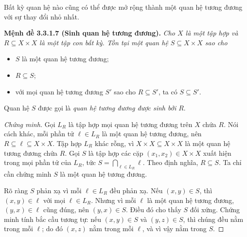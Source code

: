Bất kỳ quan hệ nào cũng có thể được mở rộng thành một quan hệ tương đương với sự thay đổi nhỏ nhất.

\noindent\textbf{Mệnh đề 3.3.1.7 (Sinh quan hệ tương đương).} \emph{Cho $X$ là một tập hợp và $R\subseteq X\times X$ là một tập con bất kỳ. Tồn tại một quan hệ $S\subseteq X\times X$ sao cho}
\begin{itemize}
\item $S$ là một quan hệ tương đương;
\item $R\subseteq S$;
\item với mọi quan hệ tương đương $S'$ sao cho $R\subseteq S'$, ta có $S\subseteq S'$.
\end{itemize}
Quan hệ $S$ được gọi là \emph{quan hệ tương đương được sinh bởi $R$}.

\begin{proof}[Chứng minh]
Gọi $L_R$ là tập hợp mọi quan hệ tương đương trên $X$ chứa $R$. Nói cách khác, mỗi phần tử $\ell\in L_R$ là một quan hệ tương đương, nên $R\subseteq\ell\subseteq X\times X$. Tập hợp $L_R$ khác rỗng, vì $X\times X\subseteq X\times X$ là một quan hệ tương đương chứa $R$. Gọi $S$ là tập hợp các cặp $(x_1,x_2)\in X\times X$ xuất hiện trong mọi phần tử của $L_R$, tức $S=\bigcap_{\ell\in L_R}\ell$. Theo định nghĩa, $R\subseteq S$. Ta chỉ cần chứng minh $S$ là một quan hệ tương đương.

Rõ ràng $S$ phản xạ vì mỗi $\ell\in L_R$ đều phản xạ. Nếu $(x,y)\in S$, thì $(x,y)\in\ell$ với mọi $\ell\in L_R$. Nhưng vì mỗi $\ell$ là một quan hệ tương đương, $(y,x)\in\ell$ cũng đúng, nên $(y,x)\in S$. Điều đó cho thấy $S$ đối xứng. Chứng minh tính bắc cầu tương tự: nếu $(x,y)\in S$ và $(y,z)\in S$, thì chúng đều nằm trong mỗi $\ell$; do đó $(x,z)$ nằm trong mỗi $\ell$, và vì vậy nằm trong $S$.
\end{proof}

